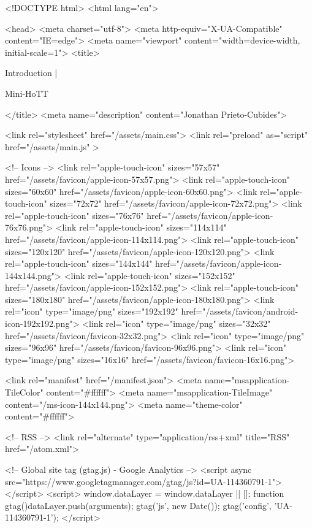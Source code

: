 <!DOCTYPE html>
<html lang="en">

<head>
  <meta charset="utf-8">
  <meta http-equiv="X-UA-Compatible" content="IE=edge">
  <meta name="viewport" content="width=device-width, initial-scale=1">
  <title>
    
      
        Introduction |
      
        Mini-HoTT
    
  </title>
  <meta name="description" content="Jonathan Prieto-Cubides">

  <link rel="stylesheet" href="/assets/main.css">
  <link rel="preload" as="script" href="/assets/main.js" >

  <!-- Icons -->
  <link rel="apple-touch-icon" sizes="57x57" href="/assets/favicon/apple-icon-57x57.png">
  <link rel="apple-touch-icon" sizes="60x60" href="/assets/favicon/apple-icon-60x60.png">
  <link rel="apple-touch-icon" sizes="72x72" href="/assets/favicon/apple-icon-72x72.png">
  <link rel="apple-touch-icon" sizes="76x76" href="/assets/favicon/apple-icon-76x76.png">
  <link rel="apple-touch-icon" sizes="114x114" href="/assets/favicon/apple-icon-114x114.png">
  <link rel="apple-touch-icon" sizes="120x120" href="/assets/favicon/apple-icon-120x120.png">
  <link rel="apple-touch-icon" sizes="144x144" href="/assets/favicon/apple-icon-144x144.png">
  <link rel="apple-touch-icon" sizes="152x152" href="/assets/favicon/apple-icon-152x152.png">
  <link rel="apple-touch-icon" sizes="180x180" href="/assets/favicon/apple-icon-180x180.png">
  <link rel="icon" type="image/png" sizes="192x192"  href="/assets/favicon/android-icon-192x192.png">
  <link rel="icon" type="image/png" sizes="32x32" href="/assets/favicon/favicon-32x32.png">
  <link rel="icon" type="image/png" sizes="96x96" href="/assets/favicon/favicon-96x96.png">
  <link rel="icon" type="image/png" sizes="16x16" href="/assets/favicon/favicon-16x16.png">

  <link rel="manifest" href="/manifest.json">
  <meta name="msapplication-TileColor" content="#ffffff">
  <meta name="msapplication-TileImage" content="/ms-icon-144x144.png">
  <meta name="theme-color" content="#ffffff">

  <!-- RSS -->
  <link rel="alternate" type="application/rss+xml" title="RSS" href="/atom.xml">

  <!-- Global site tag (gtag.js) - Google Analytics -->
  <script async src="https://www.googletagmanager.com/gtag/js?id=UA-114360791-1"></script>
  <script>
    window.dataLayer = window.dataLayer || [];
    function gtag(){dataLayer.push(arguments);}
    gtag('js', new Date());
    gtag('config', 'UA-114360791-1');
  </script>

